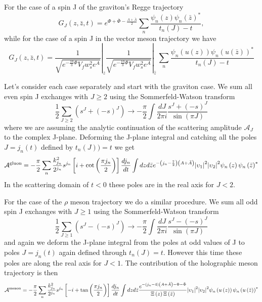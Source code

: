 \documentclass[10 pt]{article}
\begin{document}
For the case of a spin J of the graviton's Regge trajectory
\begin{equation}
G_J \left(z, \bar{z}, t \right) = e^{\Phi + \bar{\Phi} - \frac{A+\bar{A}}{2}} \sum_n \frac{\psi_n \left(z\right) {\psi_n \left(\bar{z}\right)}^*}{t_n(J) - t},
\end{equation}
while for the case of a spin J in the vector meson trajectory we have
\begin{equation}
G_J \left(z, \bar{z}, t \right)  = \left.\frac{1}{\sqrt{e^{-\frac{10}{3}\Phi} V_f w_s^2 e^A}}\right|_z  \left.\frac{1}{\sqrt{e^{-\frac{10}{3}\Phi} V_f w_s^2 e^A}}\right|_{\bar{z}} \, \sum_n \frac{\psi_n \left(u\left(z\right)\right){\psi_n \left(u\left(\bar{z}\right)\right)}^*}{t_n(J)-t}
\end{equation}

Let's consider each case separately and start with the graviton case. We sum all even spin J exchanges with $J \geqslant 2$ using the Sommerfeld-Watson transform
\begin{equation}
\frac{1}{2} \sum_{J \geqslant 2} \left( s^J + {\left(-s\right)}^J \right) \rightarrow - \frac{\pi}{2} \int \frac{dJ}{2 \pi i} \frac{s^J + {\left(-s\right)}^J}{\sin\left(\pi J\right)}
\end{equation}
where we are assuming the analytic continuation of the scattering amplitude $\mathcal{A}_J$ to the complex J-plane. Deforming the J-plane integral and catching all the poles $J = j_n\left(t\right)$ defined by $t_n\left(J\right) ) = t$ we get
\begin{align}
\mathcal{A}^{\rm {gluon}} = - \frac{\pi}{2} \sum_n \frac{k_{j_n}^2}{2^{j_n}} s^{j_n} \left[i + \cot \left( \frac{\pi j_n}{2} \right) \right] \frac{d j_n}{dt} \int dz d\bar{z} e^{-\left(j_n - \frac{7}{2}\right) \left(A+\bar{A}\right)} {|\upsilon_1|}^2 {|\upsilon_2|}^2 \psi_n \left(z\right) {\psi_n \left(\bar{z}\right)}^*
\end{align}
In the scattering domain of $t < 0$ these poles are in the real axis for $J < 2$. 

For the case of the $\rho$ meson trajectory we do a similar procedure. We sum all odd spin J exchanges with $J \geqslant 1$ using the Sommerfeld-Watson transform
\begin{equation}
\frac{1}{2} \sum_{J \geqslant 1} \left( s^J - {\left(-s\right)}^J \right) \rightarrow - \frac{\pi}{2} \int \frac{dJ}{2 \pi i} \frac{s^J - {\left(-s\right)}^J}{\sin\left(\pi J\right)}
\end{equation}
and again we deform the J-plane integral from the poles at odd values of J to poles $J = j_n\left(t\right)$ again defined through $t_n\left(J\right) = t$. However this time these poles are along the real axis for $J < 1$.
The contribution of the holographic meson trajectory is then
\begin{equation}
\mathcal{A}^{\rm {meson}} = - \frac{\pi}{2} \sum_n \frac{k_{j_n}^2}{2^{j_n}} s^{j_n} \left[-i + \tan \left( \frac{\pi j_n}{2} \right) \right] \frac{d j_n}{dt} \int dz d\bar{z} \frac{e^{-\left(j_n - 4\right) \left(A+\bar{A}\right)-\Phi - \bar{\Phi}}}{\Xi\left(z\right) \Xi\left(\bar{z}\right)} {|\upsilon_1|}^2 {|\upsilon_2|}^2 \psi_n \left(u\left(z\right)\right) {\psi_n \left(u\left(\bar{z}\right)\right)}^*
\end{equation}
\end{document}
